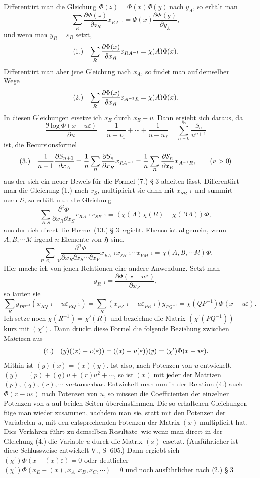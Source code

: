 \documentclass[11pt]{article}
\makeatletter
\newcommand{\Hgrp}{\mathfrak{H}}
\newcommand{\frobtag}[2]{\[\begin{array}{@{}r@{\quad}l@{}}\textup{(#1)} & \displaystyle #2\end{array}\]}
\newcommand{\frobtagc}[2]{\[\begin{array}{@{}r@{\quad}c@{}}\textup{(#1)} & \displaystyle #2\end{array}\]}
\makeatother
\begin{document}
Differentiirt man die Gleichung $\Phi(z)=\Phi(x)\Phi(y)$ nach $y_A$, so erhält man
\[
\sum_R\frac{\partial\Phi(z)}{\partial z_R}x_{RA^{-1}}=\Phi(x)\frac{\partial\Phi(y)}{\partial y_A},
\]
und wenn man $y_R=\varepsilon_R$ setzt,
\frobtagc{1.}{\sum_R\frac{\partial\Phi(x)}{\partial x_R}x_{RA^{-1}}=\chi(A)\Phi(x).}
Differentiirt man aber jene Gleichung nach $x_A$, so findet man auf demselben Wege
\frobtagc{2.}{\sum_R\frac{\partial\Phi(x)}{\partial x_R}x_{A^{-1}R}=\chi(A)\Phi(x).}
In diesen Gleichungen ersetze ich $x_E$ durch $x_E-u$. Dann ergiebt sich daraus, da
\[
\frac{\partial\log\Phi(x-u\varepsilon)}{\partial u}=\frac{1}{u-u_1}+\cdots+\frac{1}{u-u_f}=\sum_{n=0}^{\infty}\frac{S_n}{u^{n+1}}
\]
ist, die Recursionsformel
\frobtag{3.}{\frac{1}{n+1}\frac{\partial S_{n+1}}{\partial x_A}=\frac{1}{n}\sum_R\frac{\partial S_n}{\partial x_R}x_{RA^{-1}}=\frac{1}{n}\sum_R\frac{\partial S_n}{\partial x_R}x_{A^{-1}R},\qquad(n>0)}
aus der sich ein neuer Beweis für die Formel (7.) § 3 ableiten lässt. Differentiirt man die Gleichung (1.) nach $x_S$, multiplicirt sie dann mit $x_{SB^{-1}}$ und summirt nach $S$, so erhält man die Gleichung
\[
\sum_{R,S}\frac{\partial^2\Phi}{\partial x_R\partial x_S}x_{RA^{-1}}x_{SB^{-1}}=(\chi(A)\chi(B)-\chi(BA))\Phi,
\]
aus der sich direct die Formel (13.) § 3 ergiebt. Ebenso ist allgemein, wenn $A,B,\cdots M$ irgend $n$ Elemente von $\Hgrp$ sind,
\[
\sum_{R,S,\ldots,V}\frac{\partial^n\Phi}{\partial x_R\partial x_S\cdots\partial x_V}x_{RA^{-1}}x_{SB^{-1}}\cdots x_{VM^{-1}}=\chi(A,B,\cdots M)\Phi.
\]
Hier mache ich von jenen Relationen eine andere Anwendung. Setzt man
\[
y_{R^{-1}}=\frac{\partial\Phi(x-u\varepsilon)}{\partial x_R},
\]
so lauten sie
\[
\sum_R y_{PR^{-1}}(x_{RQ^{-1}}-u\varepsilon_{RQ^{-1}})=\sum_R(x_{PR^{-1}}-u\varepsilon_{PR^{-1}})y_{RQ^{-1}}=\chi(QP^{-1})\Phi(x-u\varepsilon).
\]
Ich setze noch $\chi(R^{-1})=\chi'(R)$ und bezeichne die Matrix $(\chi'(PQ^{-1}))$ kurz mit $(\chi')$. Dann drückt diese Formel die folgende Beziehung zwischen Matrizen aus
\frobtagc{4.}{(y)((x)-u(\varepsilon))=((x)-u(\varepsilon))(y)=(\chi')\Phi(x-u\varepsilon).}
Mithin ist $(y)(x)=(x)(y)$. Ist also, nach Potenzen von $u$ entwickelt, $(y)=(p)+(q)u+(r)u^2+\cdots$, so ist $(x)$ mit jeder der Matrizen $(p),(q),(r),\cdots$ vertauschbar. Entwickelt man nun in der Relation (4.) auch $\Phi(x-u\varepsilon)$ nach Potenzen von $u$, so müssen die Coefficienten der einzelnen Potenzen von $u$ auf beiden Seiten übereinstimmen. Die so erhaltenen Gleichungen füge man wieder zusammen, nachdem man sie, statt mit den Potenzen der Variabelen $u$, mit den entsprechenden Potenzen der Matrix $(x)$ multiplicirt hat. Dies Verfahren führt zu demselben Resultate, wie wenn man direct in der Gleichung (4.) die Variable $u$ durch die Matrix $(x)$ ersetzt. (Ausführlicher ist diese Schlussweise entwickelt V., S. 605.) Dann ergiebt sich $(\chi')\Phi(x-(x)\varepsilon)=0$ oder deutlicher $(\chi')\Phi(x_E-(x),x_A,x_B,x_C,\cdots)=0$ und noch ausführlicher nach (2.) § 3
\end{document}
